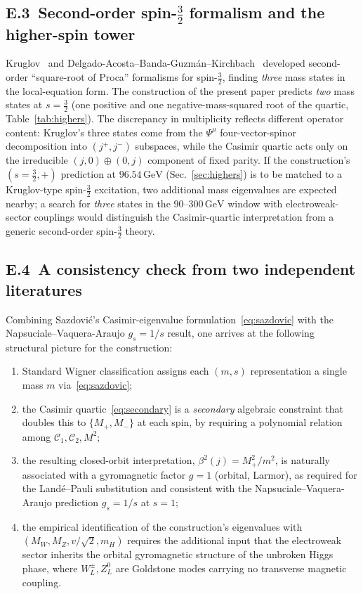 \documentclass[twocolumn,aps,prd,floatfix,nofootinbib,superscriptaddress,10pt]{article}
\newcommand{\MW}{M_W}
\newcommand{\MZ}{M_Z}
\newcommand{\mH}{m_H}
\newcommand{\C}{\mathcal{C}}
\newcommand{\GeV}{\,\mathrm{GeV}}
\begin{document}
\subsection*{E.3\, Second-order spin-$\tfrac32$ formalism and the higher-spin tower}

Kruglov~\cite{Kruglov2004} and Delgado-Acosta--Banda-Guzm\'an--Kirchbach~\cite{DelgadoBandaKirchbach2015} developed second-order ``square-root of Proca'' formalisms for spin-$\tfrac32$, finding {\em three} mass states in the local-equation form. The construction of the present paper predicts {\em two} mass states at $s=\tfrac32$ (one positive and one negative-mass-squared root of the quartic, Table~\ref{tab:highers}). The discrepancy in multiplicity reflects different operator content: Kruglov's three states come from the $\Psi^\mu$ four-vector-spinor decomposition into $(j^+,j^-)$ subspaces, while the Casimir quartic acts only on the irreducible $(j,0)\oplus(0,j)$ component of fixed parity. If the construction's $(s=\tfrac32,+)$ prediction at $96.54\GeV$ (Sec.~\ref{sec:highers}) is to be matched to a Kruglov-type spin-$\tfrac32$ excitation, two additional mass eigenvalues are expected nearby; a search for {\em three} states in the $90$--$300\GeV$ window with electroweak-sector couplings would distinguish the Casimir-quartic interpretation from a generic second-order spin-$\tfrac32$ theory.

\subsection*{E.4\, A consistency check from two independent literatures}

Combining Sazdovi\'c's Casimir-eigenvalue formulation~\eqref{eq:sazdovic} with the Napsuciale--Vaquera-Araujo $g_s=1/s$ result, one arrives at the following structural picture for the construction:

\begin{enumerate}\itemsep0pt
\item Standard Wigner classification assigns each $(m,s)$ representation a single mass $m$ via~\eqref{eq:sazdovic};
\item the Casimir quartic~\eqref{eq:secondary} is a {\em secondary} algebraic constraint that doubles this to $\{M_+,M_-\}$ at each spin, by requiring a polynomial relation among $\C_1,\C_2,M^2$;
\item the resulting closed-orbit interpretation, $\beta^2(j)=M^2_+/m^2$, is naturally associated with a gyromagnetic factor $g=1$ (orbital, Larmor), as required for the Land\'e--Pauli substitution and consistent with the Napsuciale--Vaquera-Araujo prediction $g_s=1/s$ at $s=1$;
\item the empirical identification of the construction's eigenvalues with $(\MW,\MZ,v/\sqrt2,\mH)$ requires the additional input that the electroweak sector inherits the orbital gyromagnetic structure of the unbroken Higgs phase, where $W^\pm_L,Z^0_L$ are Goldstone modes carrying no transverse magnetic coupling.
\end{enumerate}
\end{document}
